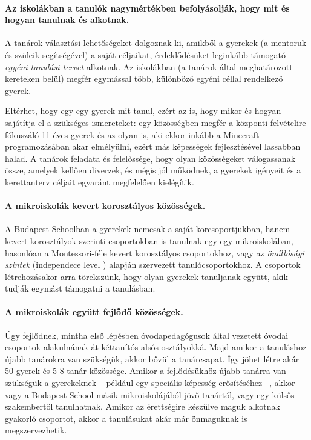   \paragraph{Az iskolákban a tanulók nagymértékben befolyásolják, hogy mit és hogyan tanulnak és alkotnak.}

    A tanárok választási lehetőségeket dolgoznak ki, amikből a gyerekek (a
    mentoruk és szüleik segítségével) a saját céljaikat, érdeklődésüket leginkább
    támogató \emph{egyéni tanulási tervet} alkotnak. Az iskolákban (a tanárok által
    meghatározott kereteken belül) megfér egymással több, különböző egyéni céllal
    rendelkező gyerek.

    Eltérhet, hogy egy-egy gyerek mit tanul, ezért az is, hogy mikor és hogyan
    sajátítja el a szükséges ismereteket: egy közösségben megfér a központi
    felvételire fókuszáló 11 éves gyerek és az olyan is, aki ekkor inkább a
    Mine\-craft programozásában akar elmélyülni, ezért más képességek fejlesztésével
    lassabban halad. A tanárok feladata és felelőssége, hogy olyan közösségeket
    válogassanak össze, amelyek kellően diverzek, és mégis jól működnek, a gyerekek
    igényeit és a kerettanterv céljait egyaránt megfelelően kielégítik.

  \paragraph{A mikroiskolák kevert korosztályos közösségek.}

    A Budapest Schoolban a gyerekek nemcsak a saját korcsoportjukban, hanem kevert korosztályok szerinti csoportokban is tanulnak egy-egy mikroiskolában, hasonlóan a Montessori-féle kevert korosztályos csoportokhoz, vagy az \emph{önállósági szintek} (independece level  \citep{indepence_level}) alapján szervezett tanulócsoportokhoz. A csoportok létrehozásakor arra törekszünk, hogy olyan gyerekek tanuljanak együtt, akik tudják egymást támogatni a tanulásban.

  \paragraph{A mikroiskolák együtt fejlődő közösségek.}

    Úgy fejlődnek, mintha első lépésben óvodapedagógusok által vezetett óvodai csoportok
    alakulnának át kéttanítós alsós osztályokká. Majd amikor a tanuláshoz újabb
    tanárokra van szükségük, akkor bővül a tanárcsapat. Így jöhet létre akár 50 gyerek és 5-8
    tanár közössége. Amikor a fejlődésükhöz újabb tanárra van szükségük a
    gyerekeknek -- például egy speciális képesség erősítéséhez --, akkor vagy a
    Budapest School másik mikroiskolájából jövő tanártól, vagy egy külsős szakembertől
    tanulhatnak. Amikor az érettségire készülve maguk alkotnak gyakorló csoportot, akkor a tanulásukat akár már önmaguknak is megszervezhetik.

